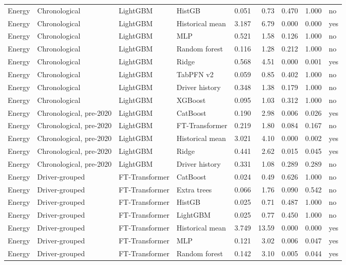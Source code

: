 {\begin{longtable}{llllrrrrl}
Energy & Chronological & LightGBM & HistGB & 0.051 & 0.73 & 0.470 & 1.000 & no \\
Energy & Chronological & LightGBM & Historical mean & 3.187 & 6.79 & 0.000 & 0.000 & yes \\
Energy & Chronological & LightGBM & MLP & 0.521 & 1.58 & 0.126 & 1.000 & no \\
Energy & Chronological & LightGBM & Random forest & 0.116 & 1.28 & 0.212 & 1.000 & no \\
Energy & Chronological & LightGBM & Ridge & 0.568 & 4.51 & 0.000 & 0.001 & yes \\
Energy & Chronological & LightGBM & TabPFN v2 & 0.059 & 0.85 & 0.402 & 1.000 & no \\
Energy & Chronological & LightGBM & Driver history & 0.348 & 1.38 & 0.179 & 1.000 & no \\
Energy & Chronological & LightGBM & XGBoost & 0.095 & 1.03 & 0.312 & 1.000 & no \\
Energy & Chronological, pre-2020 & LightGBM & CatBoost & 0.190 & 2.98 & 0.006 & 0.026 & yes \\
Energy & Chronological, pre-2020 & LightGBM & FT-Transformer & 0.219 & 1.80 & 0.084 & 0.167 & no \\
Energy & Chronological, pre-2020 & LightGBM & Historical mean & 3.021 & 4.10 & 0.000 & 0.002 & yes \\
Energy & Chronological, pre-2020 & LightGBM & Ridge & 0.441 & 2.62 & 0.015 & 0.045 & yes \\
Energy & Chronological, pre-2020 & LightGBM & Driver history & 0.331 & 1.08 & 0.289 & 0.289 & no \\
Energy & Driver-grouped & FT-Transformer & CatBoost & 0.024 & 0.49 & 0.626 & 1.000 & no \\
Energy & Driver-grouped & FT-Transformer & Extra trees & 0.066 & 1.76 & 0.090 & 0.542 & no \\
Energy & Driver-grouped & FT-Transformer & HistGB & 0.025 & 0.71 & 0.487 & 1.000 & no \\
Energy & Driver-grouped & FT-Transformer & LightGBM & 0.025 & 0.77 & 0.450 & 1.000 & no \\
Energy & Driver-grouped & FT-Transformer & Historical mean & 3.749 & 13.59 & 0.000 & 0.000 & yes \\
Energy & Driver-grouped & FT-Transformer & MLP & 0.121 & 3.02 & 0.006 & 0.047 & yes \\
Energy & Driver-grouped & FT-Transformer & Random forest & 0.142 & 3.10 & 0.005 & 0.044 & yes \\

\end{longtable}}
